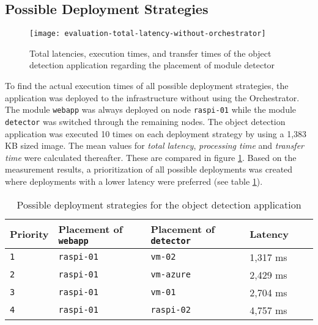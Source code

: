 \clearpage
\subsection{Possible Deployment Strategies\label{sec:eval-possible-deployments}}

\begin{figure}[h!]
    \centering
    \texttt{[image: evaluation-total-latency-without-orchestrator]}
    \caption{Total latencies, execution times, and transfer times of the object detection application regarding the placement of module detector}
    \label{fig:evaluation-total-latency-without-orchestrator}
\end{figure}

To find the actual execution times of all possible deployment strategies, the application was deployed to the infrastructure without using the Orchestrator.
The module \texttt{webapp} was always deployed on node \texttt{raspi-01} while the module \texttt{detector} was switched through the remaining nodes.
The object detection application was executed 10 times on each deployment strategy by using a 1,383 KB sized image.
The mean values for \textit{total latency}, \textit{processing time} and \textit{transfer time} were calculated thereafter. These are compared in figure \ref{fig:evaluation-total-latency-without-orchestrator}.
Based on the measurement results, a prioritization of all possible deployments was created where deployments with a lower latency were preferred (see table \ref{tab:deployment-strategies-prios}).

\begin{table}[h!]
    \centering
    \begin{tabular}{|l|l|l|l|l|l|}
    \hline
        \textbf{Priority} & \textbf{Placement of \texttt{webapp}} & \textbf{Placement of \texttt{detector}} & \textbf{Latency} \\
         \hline
         \texttt{1} & \texttt{raspi-01} & \texttt{vm-02} & 1,317 ms\\
         \hline
         \texttt{2} & \texttt{raspi-01} & \texttt{vm-azure} & 2,429 ms\\
         \hline
         \texttt{3} & \texttt{raspi-01} & \texttt{vm-01} & 2,704 ms\\
         \hline
         \texttt{4} & \texttt{raspi-01} & \texttt{raspi-02} & 4,757 ms\\
         \hline
    \end{tabular}
    \caption{Possible deployment strategies for the object detection application}
    \label{tab:deployment-strategies-prios}
\end{table}

